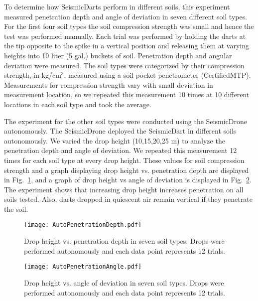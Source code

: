 To determine how SeismicDarts perform in different soils, this experiment measured penetration depth and angle of deviation in seven different soil types. For the first four soil types the soil compression strength was small and hence the test was performed manually. Each trial was performed by holding the darts at the tip opposite to the spike in a vertical position and releasing them at varying heights into 19 liter (5 gal.) buckets of soil. Penetration depth and angular deviation were measured. %
 The soil types were categorized by their compression strength, in kg/cm$^3$, measured using a soil pocket penetrometer (CertifiedMTP). Measurements for compression strength vary with small deviation in measurement location, so we repeated this measurement 10 times at 10 different locations in each soil type and took the average.
 
The experiment for the other soil types were conducted using the SeismicDrone autonomously. The SeismicDrone deployed the SeismicDart in different soils autonomously. We varied the drop height (10,15,20,25 m) to analyze the penetration depth and angle of deviation. We repeated this measurement 12 times for each soil type at every drop height.  
  These values for soil compression strength and a graph displaying drop height vs. penetration depth are displayed in Fig.~\ref{fig:DepthPlotIndoors}, and a graph of drop height vs angle of deviation is displayed in Fig.~\ref{fig:AnglePlotIndoors}. 
  The experiment shows that increasing drop height increases penetration on all soils tested.
  Also, darts dropped in quiescent air remain vertical if they penetrate the soil.


\begin{figure} \centering
{\texttt{[image: AutoPenetrationDepth.pdf]}}
\caption{Drop height vs. penetration depth in seven soil types. Drops were performed autonomously and each data point represents 12 trials.} 
\label{fig:DepthPlotIndoors}
\end{figure}

\begin{figure} \centering
{\texttt{[image: AutoPenetrationAngle.pdf]}}
\caption{Drop height vs. angle of deviation in seven soil types. Drops were performed autonomously and each data point represents 12 trials.} 
\label{fig:AnglePlotIndoors}
\vspace{-1em}
\end{figure}

